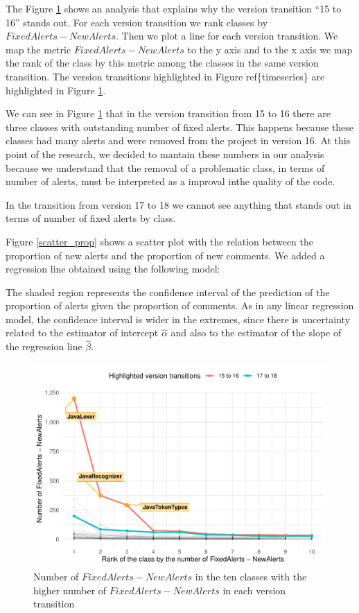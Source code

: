 \documentclass[
]{article}
\begin{document}
The Figure \ref{ouliers_analysed} shows an analysis that explains why
the version transition ``15 to 16'' stands out. For each version
transition we rank classes by \(FixedAlerts - NewAlerts\). Then we plot
a line for each version transition. We map the metric
\(FixedAlerts - NewAlerts\) to the y axis and to the x axis we map the
rank of the class by this metric among the classes in the same version
transition. The version transitions highlighted in Figure
ref\{timeseries\} are highlighted in Figure \ref{ouliers_analysed}.

We can see in Figure \ref{ouliers_analysed} that in the version
transition from 15 to 16 there are three classes with outstanding number
of fixed alerts. This happens because these classes had many alerts and
were removed from the project in version 16. At this point of the
research, we decided to mantain these numbers in our analysis because we
understand that the removal of a problematic class, in terms of number
of alerts, must be interpreted as a improval inthe quality of the code.

In the transition from version 17 to 18 we cannot see anything that
stands out in terms of number of fixed alerts by class.

\small

\normalsize



Figure \ref{scatter_prop} shows a scatter plot with the relation between the proportion of new alerts and the proportion of new comments. We added a regression line obtained using the following model:

\normalsize

The shaded region represents the confidence interval of the prediction of the proportion of alerts given the proportion of comments. As in any linear regression model, the confidence interval is wider in the extremes, since there is uncertainty related to the estimator of intercept \(\hat{\alpha}\) and also to the estimator of the slope of the regression line \(\hat{\beta}\).
   
\begin{figure}
\centering
\includegraphics{report_files/figure-latex/unnamed-chunk-24-1.pdf}
\caption{\label{ouliers_analysed}Number of \(FixedAlerts - NewAlerts\)
in the ten classes with the higher number of \(FixedAlerts - NewAlerts\)
in each version transition}
\end{figure}
\end{document}
